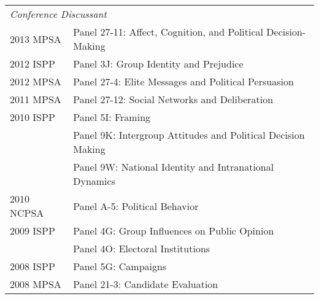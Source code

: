 \documentclass[12pt]{article}
\begin{document}
\begin{longtable}{@{}p{3.5cm}@{}l}%
    \multicolumn{2}{l}{\textit{Conference Discussant}}\\
            2013 MPSA & {Panel 27-11: Affect, 
            Cognition, and Political Decision-Making}\\
            
            2012 ISPP & {Panel 3J: Group Identity 
            and Prejudice}\\
            
            2012 MPSA & {Panel 27-4: Elite Messages 
            and Political Persuasion}\\
            
            2011 MPSA & {Panel 27-12: 
            Social Networks and Deliberation}\\
            
            2010 ISPP & {Panel 5I: Framing}\\
            
            & {Panel 9K: Intergroup Attitudes 
            and Political Decision Making}\\
            
            & {Panel 9W: National Identity 
            and Intranational Dynamics}\\
            
            2010 NCPSA & {Panel A-5: Political Behavior}\\
            
            2009 ISPP & {Panel 4G: Group Influences
             on Public Opinion}\\
             
            & {Panel 4O: Electoral Institutions}\\
            
            2008 ISPP & {Panel 5G: Campaigns}\\
            
            2008 MPSA & {Panel 21-3: Candidate Evaluation}\\
\end{longtable}
\end{document}
